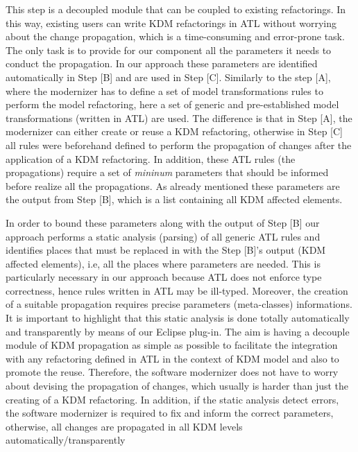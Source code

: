 This step is a decoupled module that can be coupled to existing refactorings. In this way, existing users can write KDM refactorings in ATL without worrying about the change propagation, which is a time-consuming and error-prone task. The only task is to provide for our component all the parameters it needs to conduct the propagation. In our approach these parameters are identified automatically in Step [B] and are used in Step [C]. 
%
%
Similarly to the step [A], where the modernizer has to define a set of model transformations rules to perform the model refactoring, here a set of generic and pre-established model transformations (written in ATL) are used. The difference is that in Step [A], the modernizer can either create or reuse a KDM refactoring, otherwise in Step [C] all rules were beforehand defined to perform the propagation of changes after the application of a KDM refactoring. In addition, these ATL rules (the propagations) require a set of  \textit{mininum} parameters that should be informed before realize all the propagations. As already mentioned these parameters are the output from Step [B], which is a list containing all KDM affected elements. 

In order to bound these parameters along with the output of Step [B] our approach performs a static analysis (parsing) of all generic ATL rules and identifies places that must be replaced in with the Step [B]'s output (KDM affected elements), i.e, all the places where parameters are needed. This is particularly necessary in our approach because ATL does not enforce type correctness, hence rules written in ATL may be ill-typed. Moreover, the creation of a suitable propagation %
requires precise parameters (meta-classes) informations. It is important to highlight that this static analysis is done totally automatically and transparently by means of our Eclipse plug-in. The aim is having a decouple module of KDM propagation as simple as possible to facilitate the integration with any refactoring defined in ATL in the context of KDM model and also to promote the reuse. Therefore, the software modernizer does not have to worry about devising the propagation of changes, which usually is harder than just the creating of a KDM refactoring. 
%
In addition, if the static analysis detect errors, the software modernizer is required to fix and inform the correct parameters, otherwise, all changes are propagated in all KDM levels automatically/transparently  


